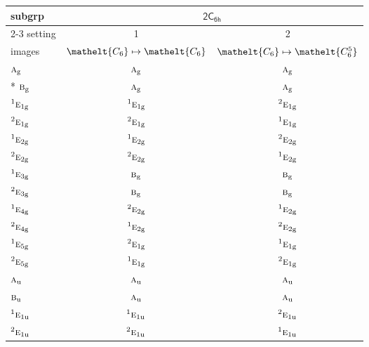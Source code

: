 \documentclass[10pt,a4paper]{article}
\numberwithin{equation}{section}
\newcommand{\eltfont}[1]{{\let\sigma\eltsigma\mathelt{#1}}}
\newcommand{\grp}[1]{\mathsf{#1}}
\newcommand{\irr}[1]{\text{\normalfont\scshape #1}}
\newcommand{\conjpair}[1]{{}^{#1}}
\newcommand{\cls}[1]{\eltfont{#1}}
\newcommand{\ptag}[1]{\mathrm{#1}}
\begin{document}
{\small\begin{longtable}{@{}lcc@{}}\toprule
subgrp & \multicolumn{2}{c}{\href{2C6h.pdf}{$\grp{2C_{6h}}$}}\\\cmidrule(lr){2-3}
setting & 1 & 2\\
images & {\scriptsize $\cls{C_{6}} \mapsto \cls{C_{6}}$} & {\scriptsize $\cls{C_{6}} \mapsto \cls{C_{6}^{5}}$}\\\midrule\endhead
\bottomrule\endfoot\endlastfoot
$\irr{a}_{\ptag{g}}$ & $\irr{a}_{\ptag{g}}$ & $\irr{a}_{\ptag{g}}$\\*
$\irr{b}_{\ptag{g}}$ & $\irr{a}_{\ptag{g}}$ & $\irr{a}_{\ptag{g}}$\\
$\conjpair{1}\irr{e}_{1\ptag{g}}$ & $\conjpair{1}\irr{e}_{1\ptag{g}}$ & $\conjpair{2}\irr{e}_{1\ptag{g}}$\\
$\conjpair{2}\irr{e}_{1\ptag{g}}$ & $\conjpair{2}\irr{e}_{1\ptag{g}}$ & $\conjpair{1}\irr{e}_{1\ptag{g}}$\\
$\conjpair{1}\irr{e}_{2\ptag{g}}$ & $\conjpair{1}\irr{e}_{2\ptag{g}}$ & $\conjpair{2}\irr{e}_{2\ptag{g}}$\\
$\conjpair{2}\irr{e}_{2\ptag{g}}$ & $\conjpair{2}\irr{e}_{2\ptag{g}}$ & $\conjpair{1}\irr{e}_{2\ptag{g}}$\\
$\conjpair{1}\irr{e}_{3\ptag{g}}$ & $\irr{b}_{\ptag{g}}$ & $\irr{b}_{\ptag{g}}$\\
$\conjpair{2}\irr{e}_{3\ptag{g}}$ & $\irr{b}_{\ptag{g}}$ & $\irr{b}_{\ptag{g}}$\\
$\conjpair{1}\irr{e}_{4\ptag{g}}$ & $\conjpair{2}\irr{e}_{2\ptag{g}}$ & $\conjpair{1}\irr{e}_{2\ptag{g}}$\\
$\conjpair{2}\irr{e}_{4\ptag{g}}$ & $\conjpair{1}\irr{e}_{2\ptag{g}}$ & $\conjpair{2}\irr{e}_{2\ptag{g}}$\\
$\conjpair{1}\irr{e}_{5\ptag{g}}$ & $\conjpair{2}\irr{e}_{1\ptag{g}}$ & $\conjpair{1}\irr{e}_{1\ptag{g}}$\\
$\conjpair{2}\irr{e}_{5\ptag{g}}$ & $\conjpair{1}\irr{e}_{1\ptag{g}}$ & $\conjpair{2}\irr{e}_{1\ptag{g}}$\\
$\irr{a}_{\ptag{u}}$ & $\irr{a}_{\ptag{u}}$ & $\irr{a}_{\ptag{u}}$\\
$\irr{b}_{\ptag{u}}$ & $\irr{a}_{\ptag{u}}$ & $\irr{a}_{\ptag{u}}$\\
$\conjpair{1}\irr{e}_{1\ptag{u}}$ & $\conjpair{1}\irr{e}_{1\ptag{u}}$ & $\conjpair{2}\irr{e}_{1\ptag{u}}$\\
$\conjpair{2}\irr{e}_{1\ptag{u}}$ & $\conjpair{2}\irr{e}_{1\ptag{u}}$ & $\conjpair{1}\irr{e}_{1\ptag{u}}$\\

\end{longtable}}
\end{document}
